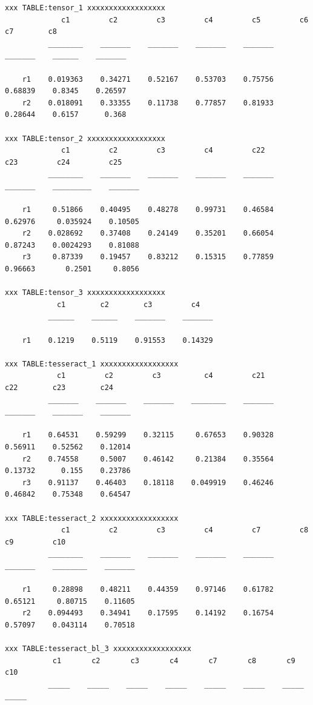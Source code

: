 \documentclass[
]{book}
\begin{document}
\begin{verbatim}
xxx TABLE:tensor_1 xxxxxxxxxxxxxxxxxx
             c1         c2         c3         c4         c5         c6         c7        c8   
          ________    _______    _______    _______    _______    _______    ______    _______

    r1    0.019363    0.34271    0.52167    0.53703    0.75756    0.68839    0.8345    0.26597
    r2    0.018091    0.33355    0.11738    0.77857    0.81933    0.28644    0.6157      0.368

xxx TABLE:tensor_2 xxxxxxxxxxxxxxxxxx
             c1         c2         c3         c4         c22        c23         c24         c25  
          ________    _______    _______    _______    _______    _______    _________    _______

    r1     0.51866    0.40495    0.48278    0.99731    0.46584    0.62976     0.035924    0.10505
    r2    0.028692    0.37408    0.24149    0.35201    0.66054    0.87243    0.0024293    0.81088
    r3     0.87339    0.19457    0.83212    0.15315    0.77859    0.96663       0.2501     0.8056

xxx TABLE:tensor_3 xxxxxxxxxxxxxxxxxx
            c1        c2        c3         c4   
          ______    ______    _______    _______

    r1    0.1219    0.5119    0.91553    0.14329

xxx TABLE:tesseract_1 xxxxxxxxxxxxxxxxxx
            c1         c2         c3          c4         c21        c22        c23        c24  
          _______    _______    _______    ________    _______    _______    _______    _______

    r1    0.64531    0.59299    0.32115     0.67653    0.90328    0.56911    0.52562    0.12014
    r2    0.74558     0.5007    0.46142     0.21384    0.35564    0.13732      0.155    0.23786
    r3    0.91137    0.46403    0.18118    0.049919    0.46246    0.46842    0.75348    0.64547

xxx TABLE:tesseract_2 xxxxxxxxxxxxxxxxxx
             c1         c2         c3         c4         c7         c8          c9         c10  
          ________    _______    _______    _______    _______    _______    ________    _______

    r1     0.28898    0.48211    0.44359    0.97146    0.61782    0.65121     0.80715    0.11605
    r2    0.094493    0.34941    0.17595    0.14192    0.16754    0.57097    0.043114    0.70518

xxx TABLE:tesseract_bl_3 xxxxxxxxxxxxxxxxxx
           c1       c2       c3       c4       c7       c8       c9       c10 
          _____    _____    _____    _____    _____    _____    _____    _____


\end{verbatim}
\end{document}
